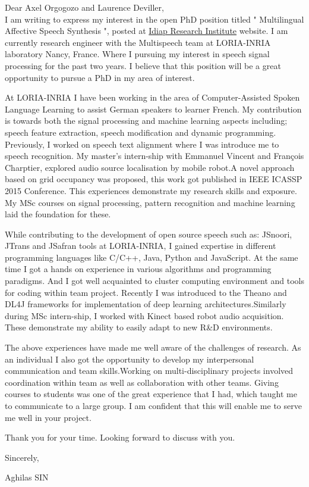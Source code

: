 \documentclass[10pt,a4paper]{letter}
\begin{document}
Dear Axel Orgogozo and Laurence Deviller,\\

		I am writing to express my interest in the open PhD position titled " Multilingual Affective Speech Synthesis ", posted at \href{https://www.idiap.ch/education-and-jobs}{Idiap Research Institute} website. I am currently research engineer with the Multispeech team at LORIA-INRIA laboratory Nancy, France. Where I pursuing my interest in speech signal processing for the past two years. I believe that this position will be a great opportunity to pursue a PhD in my area of interest. 
		
		At LORIA-INRIA I have been working in the area of Computer-Assisted Spoken Language Learning to assist German speakers to learner French. My contribution is towards both the signal processing and machine learning aspects including; speech feature extraction, speech modification and dynamic programming. Previously, I worked on speech text alignment where I was  introduce me to speech recognition. My master's intern-ship with Emmanuel Vincent and François Charptier, explored audio source localisation by mobile robot.A novel approach based on grid occupancy was proposed, this work got published in IEEE ICASSP 2015 Conference.  This experiences demonstrate my research skills and exposure. My MSc courses on signal processing, pattern recognition and machine learning laid the foundation for these.   

		
		While contributing to the development of open source speech such as: JSnoori, JTrans and JSafran tools at LORIA-INRIA, I gained expertise in different programming languages like C/C++, Java, Python and JavaScript. At the same time I got a hands on experience in various algorithms and programming paradigms. And I got well acquainted 	to cluster computing environment	and tools for coding within team project. Recently I was introduced to the Theano and DL4J frameworks for implementation of deep learning architectures.Similarly during MSc intern-ship, I worked with Kinect based robot audio acquisition. These demonstrate my ability to easily adapt to new R\&D environments.    
		
		The above experiences have made me well aware of the challenges of research. As an individual I also got the opportunity to develop my interpersonal communication and team 		
skills.Working on multi-disciplinary projects involved coordination within  team as well as collaboration with other teams. Giving courses to students was one of the great experience that I had, which taught me to communicate to a large group. I am confident that this will enable me to serve me well in your project.

	Thank you for your time. Looking forward to discuss with you.
	
Sincerely,

Aghilas SIN 
	
		
\end{document}
